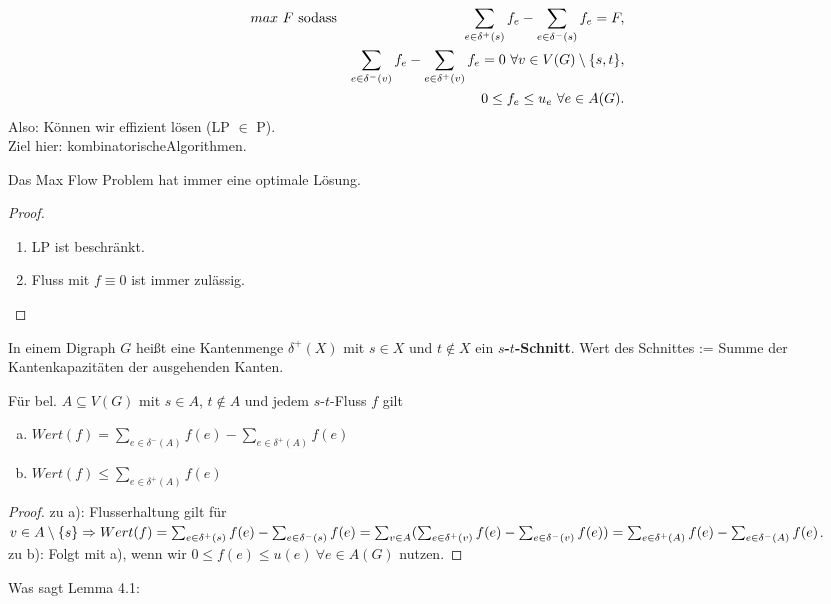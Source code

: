 \begin{eqnarray*}
	max~ F \text{ sodass} &&\sum_{e\in \delta^+(s)} f_e - \sum_{e\in \delta^-(s)} f_e = F,\\
	&&\sum_{e\in \delta^-(v)} f_e - \sum_{e\in \delta^+(v)} f_e = 0~\forall v\in V(G)\setminus \{s,t\},\\
	&&0\le f_e \le u_e~\forall e\in A(G).
\end{eqnarray*}
Also: Können wir effizient lösen (LP $\in$ P).\vspace*{5pt}\\
Ziel hier: \dq kombinatorische\dq Algorithmen.
\begin{beobachtung}
	Das Max Flow Problem hat immer eine optimale Lösung.
\end{beobachtung}
\begin{proof}~
	\begin{enumerate}
		\item LP ist beschränkt.
		\item Fluss mit $f\equiv 0$ ist immer zulässig.
	\end{enumerate}
\end{proof}
\begin{definition}
	In einem Digraph $G$ heißt eine Kantenmenge $\delta^+(X)$ mit $s\in X$ und $t\notin X$ ein \textbf{$s$-$t$-Schnitt}.
	Wert des Schnittes := Summe der Kantenkapazitäten der ausgehenden Kanten.
\end{definition}
\begin{lemma}
	Für bel. $A\subseteq V(G)$ mit $s\in A$, $t\notin A$ und jedem $s$-$t$-Fluss $f$ gilt
	\begin{enumerate}[a)]
		\item $Wert(f) = \sum_{e\in \delta^-(A)} f(e) - \sum_{e\in \delta^+(A)} f(e)$
		\item $Wert(f) \le \sum_{e\in \delta^+(A)} f(e)$
	\end{enumerate}
\end{lemma}
\begin{proof}
	zu a): Flusserhaltung gilt für $v\in A\setminus \{s\}\\ \Rightarrow Wert(f) = \sum_{e\in \delta^+(s)} f(e) - \sum_{e\in \delta^-(s)} f(e) = \sum_{v\in A}(\sum_{e\in \delta^+(v)} f(e) - \sum_{e\in \delta^-(v)} f(e)) = \sum_{e\in \delta^+(A)} f(e) - \sum_{e\in \delta^-(A)} f(e)$.\\
	zu b): Folgt mit a), wenn wir $0 \le f(e) \le u(e)~\forall e\in A(G)$ nutzen.
\end{proof}
Was sagt Lemma 4.1:\\[5pt]
